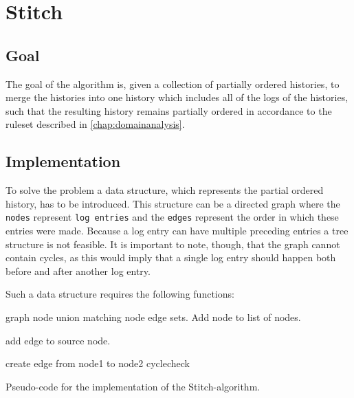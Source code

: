 
\section{Stitch}
\subsection{Goal} %
The goal of the algorithm is, given a collection of partially ordered histories, to merge the histories into one history which includes all of the logs of the histories, such that the resulting history remains partially ordered in accordance to the ruleset described in \autoref{chap:domainanalysis}.


\subsection{Implementation} %
To solve the problem a data structure, which represents the partial ordered history, has to be introduced. This structure can be  a directed graph where the \texttt{nodes} represent \texttt{log entries} and the \texttt{edges} represent the order in which these entries were made. Because a log entry can have multiple preceding entries a tree structure is not feasible. It is important to note, though, that the graph cannot contain cycles, as this would imply that a single log entry should happen both before and after another log entry.

\newpar Such a data structure requires the following functions:
\begin{algorithm}
\begin{algorithmic}
 {graph node}
	    \State union matching node edge sets.
	\Else
	    \State Add node to list of nodes.
	\EndIf
\EndFunction

\State\State

	\State add edge to source node.
\EndFunction

\State\State

		\State{}
	\EndFor
\EndFor
{}
				\State create edge from node1 to node2
			\EndIf
		\EndIf
	\EndFor
\EndFor
\State cyclecheck
\EndFunction
\end{algorithmic}
\caption{Pseudo-code for the implementation of the Stitch-algorithm.}
\end{algorithm}

